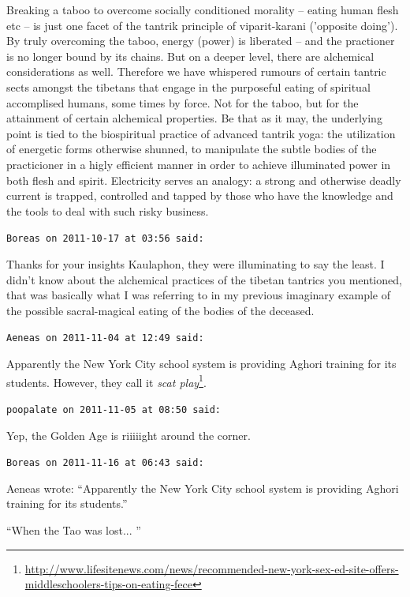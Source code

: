 \begin{footnotesize}
\begin{sffamily}
Breaking a taboo to overcome socially conditioned morality -- eating human flesh etc -- is just one facet of the tantrik principle of viparit-karani ('opposite doing'). By truly overcoming the taboo, energy (power) is liberated -- and the practioner is no longer bound by its chains. But on a deeper level, there are alchemical considerations as well. Therefore we have whispered rumours of certain tantric sects amongst the tibetans that engage in the purposeful eating of spiritual accomplised humans, some times by force. Not for the taboo, but for the attainment of certain alchemical properties. Be that as it may, the underlying point is tied to the biospiritual practice of advanced tantrik yoga: the utilization of energetic forms otherwise shunned, to manipulate the subtle bodies of the practicioner in a higly efficient manner in order to achieve illuminated power in both flesh and spirit. Electricity serves an analogy: a strong and otherwise deadly current is trapped, controlled and tapped by those who have the knowledge and the tools to deal with such risky business.

\hfill

\texttt{Boreas on 2011-10-17 at 03:56 said:}

Thanks for your insights Kaulaphon, they were illuminating to say the least. I didn't know about the alchemical practices of the tibetan tantrics you mentioned, that was basically what I was referring to in my previous imaginary example of the possible sacral-magical eating of the bodies of the deceased.

\hfill

\texttt{Aeneas on 2011-11-04 at 12:49 said:}

Apparently the New York City school system is providing Aghori training for its students. However, they call it \textit{scat play}\footnote{\url{http://www.lifesitenews.com/news/recommended-new-york-sex-ed-site-offers-middleschoolers-tips-on-eating-fece}}.

\hfill

\texttt{poopalate on 2011-11-05 at 08:50 said:}

Yep, the Golden Age is riiiiight around the corner.

\hfill

\texttt{Boreas on 2011-11-16 at 06:43 said:}

Aeneas wrote: ``Apparently the New York City school system is providing Aghori training for its students.''

``When the Tao was lost... ''


\end{sffamily}
\end{footnotesize}
